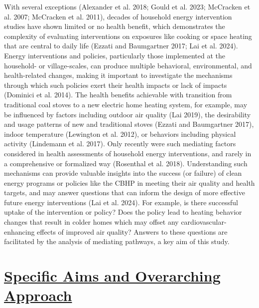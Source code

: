 \documentclass[
  letterpaper,
  DIV=11,
  numbers=noendperiod]{scrartcl}
\providecommand{\DIFadd}[1]{{\protect\color{blue}\underline{#1}}} %
\providecommand{\DIFaddbegin}{} %
\providecommand{\DIFaddend}{} %
\providecommand{\DIFdelbegin}{} %
\providecommand{\DIFdelend}{} %
\newcommand{\DIFscaledelfig}{0.5}
\newlength{\DIFdelgraphicswidth} %
\newlength{\DIFdelgraphicsheight} %
\newcommand{\DIFaddincludegraphics}[2][]{{\color{blue}\fbox{\DIFOincludegraphics[#1]{#2}}}} %
\newcommand{\DIFdelincludegraphics}[2][]{%
\sbox{\DIFdelgraphicsbox}{\DIFOincludegraphics[#1]{#2}}%
\settoboxwidth{\DIFdelgraphicswidth}{\DIFdelgraphicsbox} %
\settoboxtotalheight{\DIFdelgraphicsheight}{\DIFdelgraphicsbox} %
\scalebox{\DIFscaledelfig}{%
\parbox[b]{\DIFdelgraphicswidth}{\usebox{\DIFdelgraphicsbox}\\[-\baselineskip] \rule{\DIFdelgraphicswidth}{0em}}\llap{\resizebox{\DIFdelgraphicswidth}{\DIFdelgraphicsheight}{%
\setlength{\unitlength}{\DIFdelgraphicswidth}%
\begin{picture}(1,1)%
\thicklines\linethickness{2pt} %
{\color[rgb]{1,0,0}\put(0,0){\framebox(1,1){}}}%
{\color[rgb]{1,0,0}\put(0,0){\line( 1,1){1}}}%
{\color[rgb]{1,0,0}\put(0,1){\line(1,-1){1}}}%
\end{picture}%
}\hspace*{3pt}}} %
} %
\DeclareRobustCommand{\DIFaddbegin}{\DIFOaddbegin \let\includegraphics\DIFaddincludegraphics} %
\DeclareRobustCommand{\DIFaddend}{\DIFOaddend \let\includegraphics\DIFOincludegraphics} %
\DeclareRobustCommand{\DIFdelbegin}{\DIFOdelbegin \let\includegraphics\DIFdelincludegraphics} %
\DeclareRobustCommand{\DIFdelend}{\DIFOaddend \let\includegraphics\DIFOincludegraphics} %
\begin{document}
With several exceptions (Alexander et al. 2018; Gould et al. 2023;
McCracken et al. 2007; McCracken et al. 2011), decades of household
energy intervention studies have shown limited or no health benefit,
which demonstrates the complexity of evaluating interventions on
exposures like cooking or space heating that are central to daily life
(Ezzati and Baumgartner 2017; Lai et al. 2024). Energy interventions and
policies, particularly those implemented at the household- or
village-scales, can produce multiple behavioral, environmental, and
health-related changes, making it important to investigate the
mechanisms through which such policies exert their health impacts or
lack of impacts (Dominici et al. 2014). The health benefits achievable
with transition from traditional coal stoves to a new electric home
heating system, for example, may be influenced by factors including
outdoor air quality (Lai 2019), the desirability and usage patterns of
new and traditional stoves (Ezzati and Baumgartner 2017), indoor
temperature (Lewington et al. 2012), or behaviors including physical
activity (Lindemann et al. 2017). Only recently were such mediating
factors considered in health assessments of household energy
interventions, and rarely in a comprehensive or formalized way
(Rosenthal et al. 2018). Understanding such mechanisms can provide
valuable insights into the success (or failure) of clean energy programs
or policies like the CBHP in meeting their air quality and health
targets, and may answer questions that can inform the design of more
effective future energy interventions (Lai et al. 2024). For example, is
there successful uptake of the intervention or policy? Does the policy
lead to heating behavior changes that result in colder homes which may
offset any cardiovascular-enhancing effects of improved air quality?
Answers to these questions are facilitated by the analysis of mediating
pathways, a key aim of this study.

\DIFdelbegin %
\DIFdelend \DIFaddbegin \section{\DIFadd{Specific Aims and Overarching
Approach}}\label{specific-aims-and-overarching-approach}
\DIFaddend 
\end{document}
